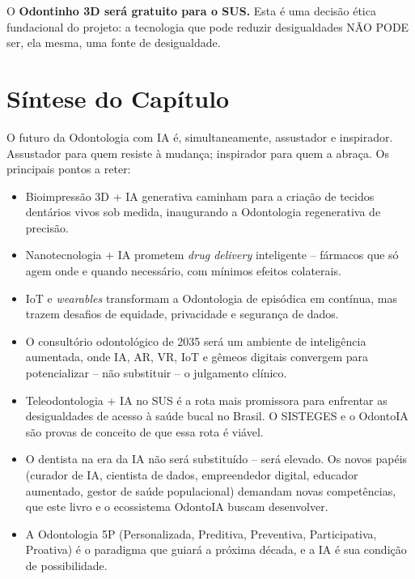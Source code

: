 O \textbf{Odontinho 3D será gratuito para o SUS.} Esta é uma decisão ética
fundacional do projeto: a tecnologia que pode reduzir desigualdades NÃO PODE
ser, ela mesma, uma fonte de desigualdade.


\section{Síntese do Capítulo}

O futuro da Odontologia com IA é, simultaneamente, assustador e inspirador.
Assustador para quem resiste à mudança; inspirador para quem a abraça. Os
principais pontos a reter:

\begin{itemize}
  \item Bioimpressão 3D + IA generativa caminham para a criação de tecidos
    dentários vivos sob medida, inaugurando a Odontologia regenerativa de
    precisão.

  \item Nanotecnologia + IA prometem \textit{drug delivery} inteligente --
    fármacos que só agem onde e quando necessário, com mínimos efeitos
    colaterais.

  \item IoT e \textit{wearables} transformam a Odontologia de episódica em
    contínua, mas trazem desafios de equidade, privacidade e segurança de
    dados.

  \item O consultório odontológico de 2035 será um ambiente de inteligência
    aumentada, onde IA, AR, VR, IoT e gêmeos digitais convergem para
    potencializar -- não substituir -- o julgamento clínico.

  \item Teleodontologia + IA no SUS é a rota mais promissora para enfrentar
    as desigualdades de acesso à saúde bucal no Brasil. O SISTEGES e o OdontoIA
    são provas de conceito de que essa rota é viável.

  \item O dentista na era da IA não será substituído -- será elevado. Os novos
    papéis (curador de IA, cientista de dados, empreendedor digital, educador
    aumentado, gestor de saúde populacional) demandam novas competências, que
    este livro e o ecossistema OdontoIA buscam desenvolver.

  \item A Odontologia 5P (Personalizada, Preditiva, Preventiva, Participativa,
    Proativa) é o paradigma que guiará a próxima década, e a IA é sua condição
    de possibilidade.
\end{itemize}

